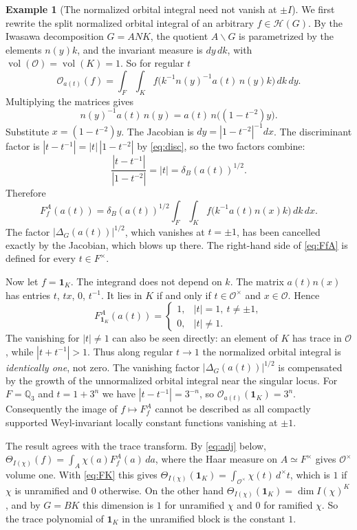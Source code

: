 \documentclass[12pt,letterpaper]{amsart}
\numberwithin{equation}{section}
\theoremstyle{definition}
\newtheorem{example}[theorem]{Example}
\theoremstyle{remark}
\newcommand{\calH}{\mathcal H}
\newcommand{\vol}{\operatorname{vol}}
\begin{document}
\begin{example}[The normalized orbital integral need not vanish at $\pm I$]\label{ex:K}
We first rewrite the split normalized orbital integral of an arbitrary $f\in\calH(G)$. By the Iwasawa decomposition $G=ANK$, the quotient $A\backslash G$ is parametrized by the elements $n(y)k$, and the invariant measure is $dy\,dk$, with $\vol(\mathcal O)=\vol(K)=1$. So for regular $t$
\[
\mathcal O_{a(t)}(f)=\int_F\int_Kf\bigl(k^{-1}n(y)^{-1}a(t)\,n(y)k\bigr)\,dk\,dy .
\]
Multiplying the matrices gives
\begin{equation}\label{eq:conj-n}
n(y)^{-1}a(t)\,n(y)=a(t)\,n\bigl((1-t^{-2})y\bigr).
\end{equation}
Substitute $x=(1-t^{-2})y$. The Jacobian is $dy=|1-t^{-2}|^{-1}dx$. The discriminant factor is $|t-t^{-1}|=|t|\,|1-t^{-2}|$ by \eqref{eq:disc}, so the two factors combine:
\[
\frac{|t-t^{-1}|}{|1-t^{-2}|}=|t|=\delta_B(a(t))^{1/2}.
\]
Therefore
\begin{equation}\label{eq:FfA}
F_f^A(a(t))=\delta_B(a(t))^{1/2}\int_F\int_K f\bigl(k^{-1}a(t)n(x)k\bigr)\,dk\,dx .
\end{equation}
The factor $|\Delta_G(a(t))|^{1/2}$, which vanishes at $t=\pm1$, has been cancelled exactly by the Jacobian, which blows up there. The right-hand side of \eqref{eq:FfA} is defined for every $t\in F^\times$.

Now let $f=\mathbf 1_K$. The integrand does not depend on $k$. The matrix $a(t)n(x)$ has entries $t$, $tx$, $0$, $t^{-1}$. It lies in $K$ if and only if $t\in\mathcal O^\times$ and $x\in\mathcal O$. Hence
\begin{equation}\label{eq:FK}
F_{\mathbf 1_K}^A(a(t))=
\begin{cases}
1,&|t|=1,\ t\ne\pm1,\\
0,&|t|\ne1.
\end{cases}
\end{equation}
The vanishing for $|t|\ne1$ can also be seen directly: an element of $K$ has trace in $\mathcal O$, while $|t+t^{-1}|>1$. Thus along regular $t\to1$ the normalized orbital integral is \emph{identically one}, not zero.  The vanishing factor $|\Delta_G(a(t))|^{1/2}$ is compensated by the growth of the unnormalized orbital integral near the singular locus. For $F=\mathbb Q_3$ and $t=1+3^n$ we have $|t-t^{-1}|=3^{-n}$, so $\mathcal O_{a(t)}(\mathbf 1_K)=3^n$. Consequently the image of $f\mapsto F_f^A$ cannot be described as all compactly supported Weyl-invariant locally constant functions vanishing at $\pm1$.

The result agrees with the trace transform. By \eqref{eq:adj} below, $\Theta_{I(\chi)}(f)=\int_A\chi(a)F_f^A(a)\,da$, where the Haar measure on $A\simeq F^\times$ gives $\mathcal O^\times$ volume one. With \eqref{eq:FK} this gives $\Theta_{I(\chi)}(\mathbf 1_K)=\int_{\mathcal O^\times}\chi(t)\,d^\times t$, which is $1$ if $\chi$ is unramified and $0$ otherwise. On the other hand $\Theta_{I(\chi)}(\mathbf 1_K)=\dim I(\chi)^K$, and by $G=BK$ this dimension is $1$ for unramified $\chi$ and $0$ for ramified $\chi$. So the trace polynomial of $\mathbf 1_K$ in the unramified block is the constant $1$.
\end{example}
\end{document}
